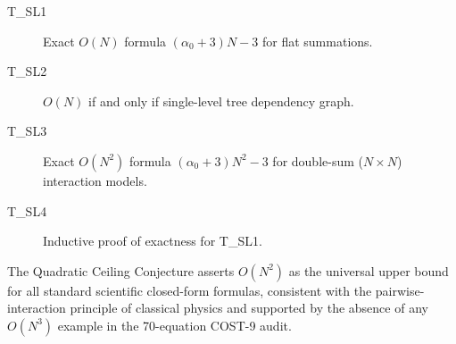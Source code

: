 \documentclass[12pt,a4paper]{article}
\theoremstyle{definition}
\begin{document}
\begin{description}
  \item[T\_SL1] Exact $O(N)$ formula $(\alpha_0 + 3)N - 3$ for flat summations.
  \item[T\_SL2] $O(N)$ if and only if single-level tree dependency graph.
  \item[T\_SL3] Exact $O(N^2)$ formula $(\alpha_0 + 3)N^2 - 3$ for double-sum
                ($N \times N$) interaction models.
  \item[T\_SL4] Inductive proof of exactness for T\_SL1.
\end{description}

The Quadratic Ceiling Conjecture asserts $O(N^2)$ as the universal upper bound
for all standard scientific closed-form formulas, consistent with the
pairwise-interaction principle of classical physics and supported by the
absence of any $O(N^3)$ example in the 70-equation COST-9 audit.
\end{document}
